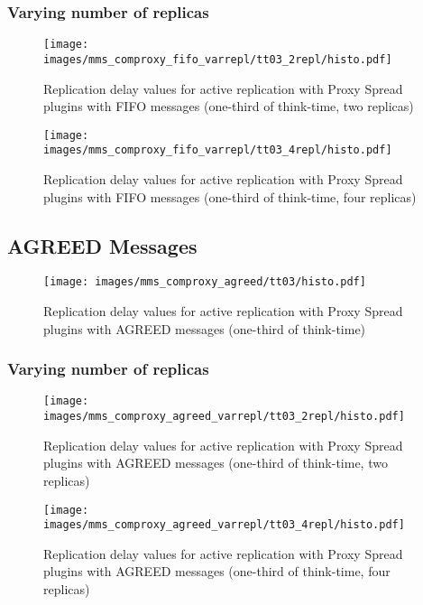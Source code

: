 \clearpage


\subsubsection{Varying number of replicas}

\begin{figure}[h!]
\centering    
\texttt{[image: images/mms\_comproxy\_fifo\_varrepl/tt03\_2repl/histo.pdf]}
\caption{Replication delay values for active replication with Proxy Spread plugins with FIFO messages (one-third of think-time, two replicas)}
\end{figure}

\begin{figure}[h!]
\centering 
\texttt{[image: images/mms\_comproxy\_fifo\_varrepl/tt03\_4repl/histo.pdf]}
\caption{Replication delay values for active replication with Proxy Spread plugins with FIFO messages (one-third of think-time, four replicas)}
\end{figure}

\clearpage

\subsection{AGREED Messages}

\begin{figure}[h!]
\centering    
\texttt{[image: images/mms\_comproxy\_agreed/tt03/histo.pdf]}
\caption{Replication delay values for active replication with Proxy Spread plugins with AGREED messages (one-third of think-time)}
\end{figure}

\clearpage

\subsubsection{Varying number of replicas}

\begin{figure}[h!]
\centering    
\texttt{[image: images/mms\_comproxy\_agreed\_varrepl/tt03\_2repl/histo.pdf]}
\caption{Replication delay values for active replication with Proxy Spread plugins with AGREED messages (one-third of think-time, two replicas)}
\end{figure}

\begin{figure}[h!]
\centering    
\texttt{[image: images/mms\_comproxy\_agreed\_varrepl/tt03\_4repl/histo.pdf]}
\caption{Replication delay values for active replication with Proxy Spread plugins with AGREED messages (one-third of think-time, four replicas)}
\end{figure}